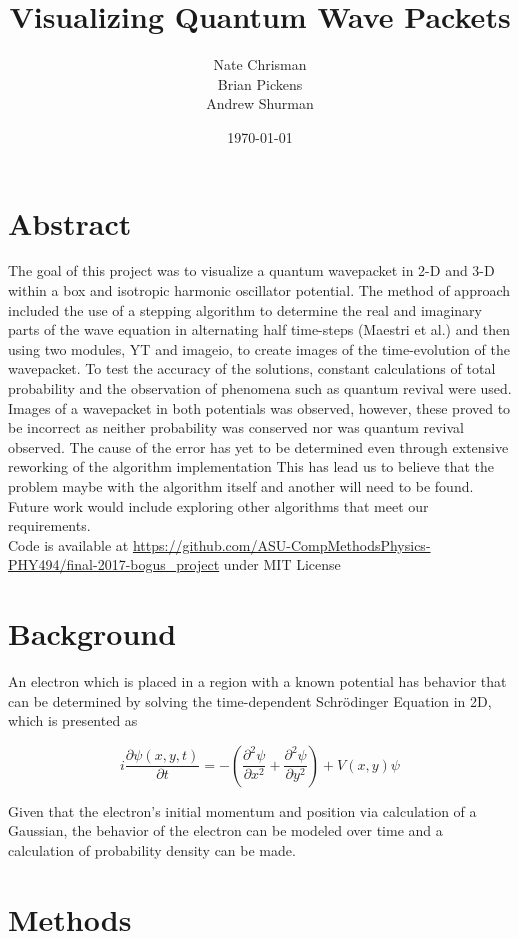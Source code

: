 \documentclass{article}
\title{Visualizing Quantum Wave Packets}
\author{Nate Chrisman \\ Brian Pickens \\ Andrew Shurman}
\date{\today}
\begin{document}
	\maketitle
	\clearpage
	
\section*{Abstract}
The goal of this project was to visualize a quantum wavepacket in 2-D and 3-D within a box and isotropic harmonic oscillator potential. The method of approach included the use of a stepping algorithm to determine the real and imaginary parts of the wave equation in alternating half time-steps (Maestri et al.) and then using two modules, YT and imageio, to create images of the time-evolution of the wavepacket. To test the accuracy of the solutions, constant calculations of total probability and the observation of phenomena such as quantum revival were used. Images of a wavepacket in both potentials was observed, however, these proved to be incorrect as neither probability was conserved nor was quantum revival observed. The cause of the error has yet to be determined even through extensive reworking of the algorithm implementation This has lead us to believe that the problem maybe with the algorithm itself and another will need to be found. Future work would include exploring other algorithms that meet our requirements. \\

\noindent Code is available at \url{https://github.com/ASU-CompMethodsPhysics-PHY494/final-2017-bogus_project} under MIT License

\section*{Background}
An electron which is placed in a region with a known potential has behavior that can be determined by solving the time-dependent Schr{\"o}dinger Equation in 2D, which is presented as

$$i\dfrac{\partial\psi(x, y, t)}{\partial t}=-\left(\dfrac{\partial^{2}\psi}{\partial x^{2}}+\dfrac{\partial^{2}\psi}{\partial y^{2}}\right) + V(x, y)\psi$$

\noindent Given that the electron's initial momentum and position via calculation of a Gaussian, the behavior of the electron can be modeled over time and a calculation of probability density can be made.


\section*{Methods}
\end{document}

